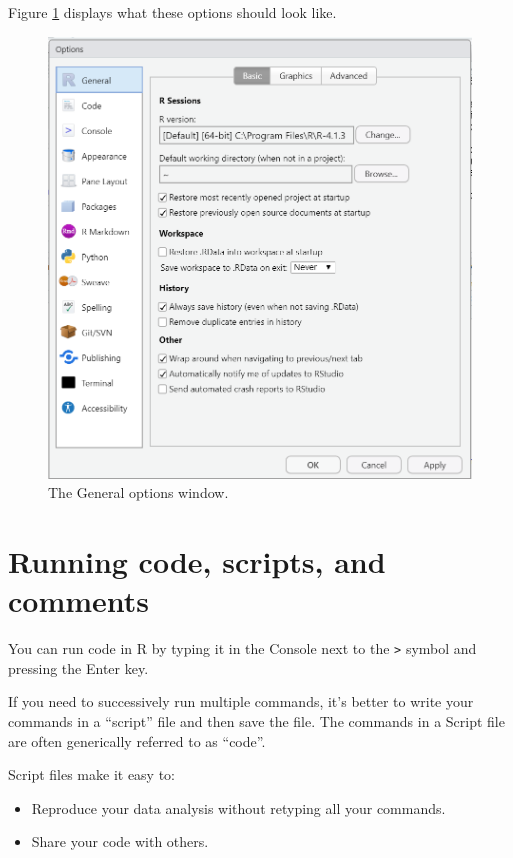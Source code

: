 \documentclass[
]{book}
\providecommand{\tightlist}{%
  \setlength{\itemsep}{0pt}\setlength{\parskip}{0pt}}
\theoremstyle{definition}
\theoremstyle{definition}
\theoremstyle{definition}
\theoremstyle{definition}
\theoremstyle{remark}
\begin{document}
Figure \ref{fig:generaloptions} displays what these options should look like.

\begin{figure}
\includegraphics[width=0.9\linewidth]{pictures/general_options} \caption{The General options window.}\label{fig:generaloptions}
\end{figure}

\hypertarget{running-code-scripts-and-comments}{%
\section{Running code, scripts, and comments}\label{running-code-scripts-and-comments}}

You can run code in R by typing it in the Console next to the \texttt{\textgreater{}} symbol and pressing the Enter key.

If you need to successively run multiple commands, it's better to write your commands in a ``script'' file and then save the file. The commands in a Script file are often generically referred to as ``code''.

Script files make it easy to:

\begin{itemize}
\tightlist
\item
  Reproduce your data analysis without retyping all your commands.
\item
  Share your code with others.
\end{itemize}
\end{document}
